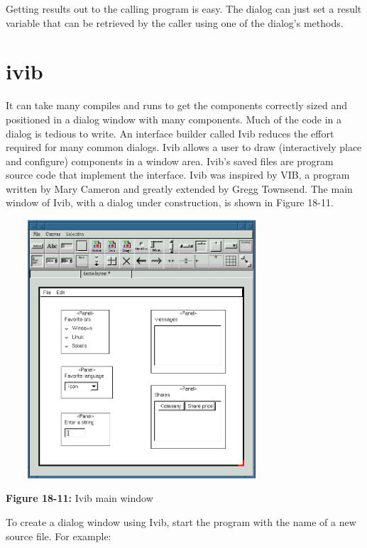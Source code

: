 Getting results out to the calling program is easy. The dialog
can just set a result variable that can be retrieved by
the caller using one of the dialog's methods.

\section{\textsf{ivib}}

It can
take many compiles and runs to get the components
correctly sized and positioned
in a dialog window with many components. Much of the code in a
dialog is tedious to write.
An
interface builder called Ivib
reduces the effort required for many common dialogs.
Ivib allows a user to draw (interactively place and configure)
components in a window area. Ivib's saved files are program source code
that implement the interface. Ivib was inspired by VIB, a program
written by Mary Cameron and greatly extended by
Gregg Townsend. The main window of Ivib, with a
dialog under construction, is shown in Figure 18-11.

\begin{center}
\includegraphics[width=4.0in,height=3.8in]{ub-img/ub-img60.png}
\end{center}

{\sffamily\bfseries Figure 18-11:}
{\sffamily Ivib main window}

To create a dialog window using Ivib, start the program with the name of
a new source file. For example:


